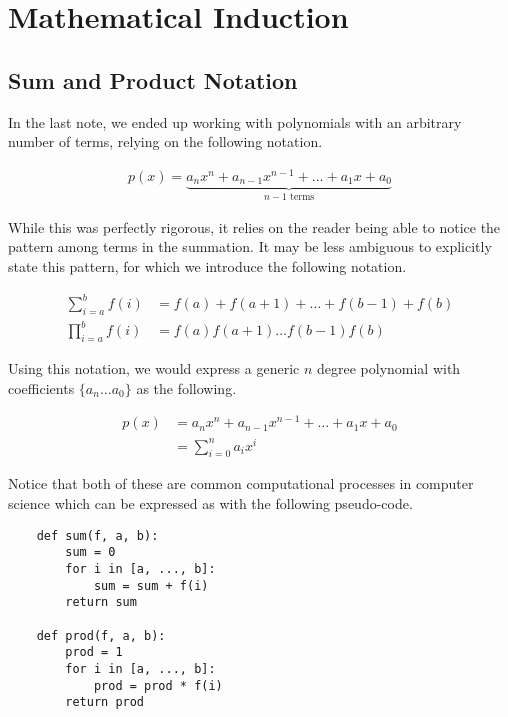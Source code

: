 \chapter{Mathematical Induction}

\section{Sum and Product Notation}

In the last note, we ended up working with polynomials with an arbitrary number of terms, relying on the following notation.

\begin{align*}
	p(x) = \underbrace{a_n x^n + a_{n - 1} x^{n - 1} + \dots + a_1 x + a_0}_\text{$n - 1$ terms}
\end{align*}

While this was perfectly rigorous, it relies on the reader being able to notice the pattern among terms in the summation. It may be less ambiguous to explicitly state this pattern, for which we introduce the following notation.

\begin{align*}
	\sum_{i = a}^b f(i) &= f(a) + f(a + 1) + \dots + f(b - 1) + f(b) \\
	\prod_{i = a}^b f(i) &= f(a) f(a + 1) \dots f(b - 1) f(b)
\end{align*}

Using this notation, we would express a generic $n$ degree polynomial with coefficients $\{ a_n \dots a_0 \}$ as the following.

\begin{align*}
	p(x) &= a_n x^n + a_{n - 1} x^{n - 1} + \dots + a_1 x + a_0 \\
	&= \sum_{i = 0}^n a_i x^i
\end{align*}

Notice that both of these are common computational processes in computer science which can be expressed as with the following pseudo-code.

\vspace{\baselineskip}
\begin{lstlisting}
	def sum(f, a, b):
		sum = 0
		for i in [a, ..., b]:
			sum = sum + f(i)
		return sum
		
	def prod(f, a, b):
		prod = 1
		for i in [a, ..., b]:
			prod = prod * f(i)
		return prod
\end{lstlisting}

